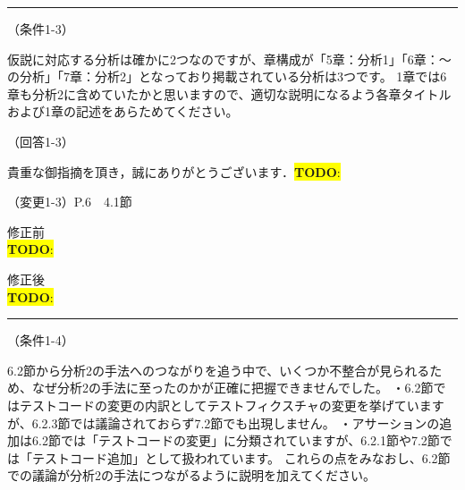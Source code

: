 \documentclass{jarticle} %
\newcommand{\todo}[1]{\colorbox{yellow}{{\bf TODO}:}{\color{red}{\textbf{[#1]}}}}
\def\subsection#1{ \vspace{1pc} {\gt #1} }
\def\nextans{ \vspace{2pc} \hrule }
\begin{document}
\newpage
\nextans
\subsection{（条件1-3）}

仮説に対応する分析は確かに2つなのですが、章構成が「5章：分析1」「6章：～の分析」「7章：分析2」となっており掲載されている分析は3つです。
1章では6章も分析2に含めていたかと思いますので、適切な説明になるよう各章タイトルおよび1章の記述をあらためてください。

\subsection{（回答1-3）}

貴重な御指摘を頂き，誠にありがとうございます．\todo{hoge}



\newpage
\subsection{（変更1-3）P.6　4.1節}
\vspace{-0.3cm}
\begin{description}
\item 修正前\\
\phantom{　}
\todo{hoge}
\vspace{-0.3cm}
\item 修正後\\
\phantom{　}
\todo{hoge}
\end{description}



\newpage
\nextans
\subsection{（条件1-4）}

6.2節から分析2の手法へのつながりを追う中で、いくつか不整合が見られるため、なぜ分析2の手法に至ったのかが正確に把握できませんでした。
・6.2節ではテストコードの変更の内訳としてテストフィクスチャの変更を挙げていますが、6.2.3節では議論されておらず7.2節でも出現しません。
・アサーションの追加は6.2節では「テストコードの変更」に分類されていますが、6.2.1節や7.2節では「テストコード追加」として扱われています。
これらの点をみなおし、6.2節での議論が分析2の手法につながるように説明を加えてください。
\end{document}
